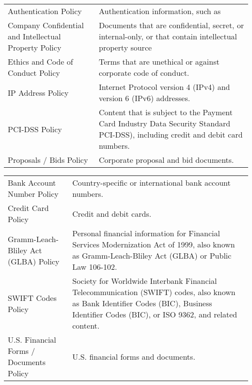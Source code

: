 \documentclass[letterpaper,10pt,english]{sphinxmanual}
\begin{document}
\begin{savenotes}\sphinxattablestart
\centering
\begin{tabulary}{\linewidth}[t]{|T|T|}
\hline
{}\relax &\relax \\
\hline
Authentication Policy
&
Authentication information, such as
\\
\hline
Company Confidential
and Intellectual
Property Policy
&
Documents that are confidential,
secret, or internal-only, or that
contain intellectual property source
\\
\hline
Ethics and Code of
Conduct Policy
&
Terms that are unethical or against
corporate code of conduct.
\\
\hline
IP Address Policy
&
Internet Protocol version 4 (IPv4)
and version 6 (IPv6) addresses.
\\
\hline
PCI-DSS Policy
&
Content that is subject to the Payment
Card Industry Data Security Standard
PCI-DSS), including credit and debit
card numbers.
\\
\hline
Proposals / Bids Policy
&
Corporate proposal and bid documents.
\\
\hline
\end{tabulary}
\par
\sphinxattableend\end{savenotes}



\begin{savenotes}\sphinxattablestart
\centering
\begin{tabulary}{\linewidth}[t]{|T|T|}
\hline
{}\relax &\relax \\
\hline
Bank Account Number Policy
&
Country-specific or international bank account numbers.
\\
\hline
Credit Card Policy
&
Credit and debit cards.
\\
\hline
Gramm-Leach-Bliley Act (GLBA) Policy
&
Personal financial information for Financial
Services Modernization Act of 1999, also known
as Gramm-Leach-Bliley Act (GLBA) or Public Law
106-102.
\\
\hline
SWIFT Codes Policy
&
Society for Worldwide Interbank Financial Telecommunication
(SWIFT) codes, also known as Bank Identifier Codes (BIC),
Business Identifier Codes (BIC), or ISO 9362, and related
content.
\\
\hline
U.S. Financial Forms / Documents
Policy
&
U.S. financial forms and documents.
\\
\hline
\end{tabulary}
\par
\sphinxattableend\end{savenotes}
\end{document}
